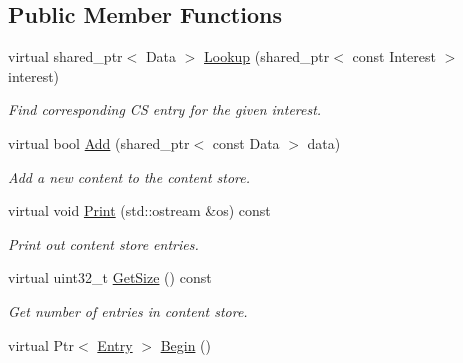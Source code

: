 \subsection*{Public Member Functions}
\begin{DoxyCompactItemize}
\item 
virtual shared\+\_\+ptr$<$ Data $>$ \hyperlink{classns3_1_1ndn_1_1cs_1_1ContentStoreImpl_acb05ee7b500f71f02a462b705d538a91}{Lookup} (shared\+\_\+ptr$<$ const Interest $>$ interest)
\begin{DoxyCompactList}\small\item\em Find corresponding CS entry for the given interest. \end{DoxyCompactList}\item 
virtual bool \hyperlink{classns3_1_1ndn_1_1cs_1_1ContentStoreImpl_adb15b99cef032bd661f44447be1c9d68}{Add} (shared\+\_\+ptr$<$ const Data $>$ data)
\begin{DoxyCompactList}\small\item\em Add a new content to the content store. \end{DoxyCompactList}\item 
virtual void \hyperlink{classns3_1_1ndn_1_1cs_1_1ContentStoreImpl_a81a3862251332eb480356e8f6e08981e}{Print} (std\+::ostream \&os) const\hypertarget{classns3_1_1ndn_1_1cs_1_1ContentStoreImpl_a81a3862251332eb480356e8f6e08981e}{}\label{classns3_1_1ndn_1_1cs_1_1ContentStoreImpl_a81a3862251332eb480356e8f6e08981e}

\begin{DoxyCompactList}\small\item\em Print out content store entries. \end{DoxyCompactList}\item 
virtual uint32\+\_\+t \hyperlink{classns3_1_1ndn_1_1cs_1_1ContentStoreImpl_a05e8ef063fdab495fa1ffbb33d16ca1c}{Get\+Size} () const\hypertarget{classns3_1_1ndn_1_1cs_1_1ContentStoreImpl_a05e8ef063fdab495fa1ffbb33d16ca1c}{}\label{classns3_1_1ndn_1_1cs_1_1ContentStoreImpl_a05e8ef063fdab495fa1ffbb33d16ca1c}

\begin{DoxyCompactList}\small\item\em Get number of entries in content store. \end{DoxyCompactList}\item 
virtual Ptr$<$ \hyperlink{classns3_1_1ndn_1_1cs_1_1Entry}{Entry} $>$ \hyperlink{classns3_1_1ndn_1_1cs_1_1ContentStoreImpl_a97c9afaa59b73c1377c210d60018321f}{Begin} ()\hypertarget{classns3_1_1ndn_1_1cs_1_1ContentStoreImpl_a97c9afaa59b73c1377c210d60018321f}{}\label{classns3_1_1ndn_1_1cs_1_1ContentStoreImpl_a97c9afaa59b73c1377c210d60018321f}


\end{DoxyCompactItemize}
